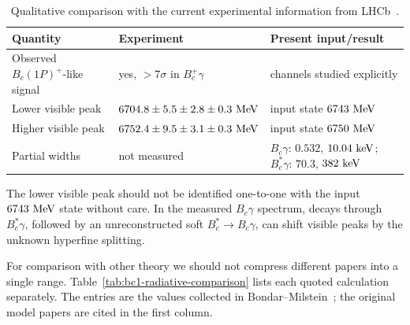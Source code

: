 \documentclass[11pt]{article}
\newcommand{\Bc}{B_c}
\newcommand{\Bcst}{B_c^\ast}
\begin{document}
\begin{table}[h]
\centering
\caption{Qualitative comparison with the current experimental information
from LHCb~\cite{LHCbBc1PObservation2025,LHCbBc1PStudy2025}.}
\scriptsize
\setlength{\tabcolsep}{4pt}
\begin{tabular}{lll}
\toprule
Quantity & Experiment & Present input/result\\
\midrule
Observed \(B_c(1P)^+\)-like signal
& yes, \(>7\sigma\) in \(\Bc^+\gamma\)
& channels studied explicitly\\
Lower visible peak
& \(6704.8\pm5.5\pm2.8\pm0.3~{\rm MeV}\)
& input state \(6743~{\rm MeV}\)\\
Higher visible peak
& \(6752.4\pm9.5\pm3.1\pm0.3~{\rm MeV}\)
& input state \(6750~{\rm MeV}\)\\
Partial widths
& not measured
& \(\Bc\gamma\): \(0.532\), \(10.04~{\rm keV}\);
  \(\Bcst\gamma\): \(70.3\), \(382~{\rm keV}\)\\
\bottomrule
\end{tabular}
\end{table}

The lower visible peak should not be identified one-to-one with the input
\(6743~{\rm MeV}\) state without care.  In the measured \(\Bc\gamma\) spectrum,
decays through \(\Bcst\gamma\), followed by an unreconstructed soft
\(\Bcst\to\Bc\gamma\), can shift visible peaks by the unknown hyperfine
splitting.

For comparison with other theory we should not compress different papers into
a single range.  Table~\ref{tab:bc1-radiative-comparison} lists each quoted
calculation separately.  The entries are the values collected in
Bondar--Milstein~\cite{BondarMilstein2025}; the original model papers are
cited in the first column.
\end{document}
